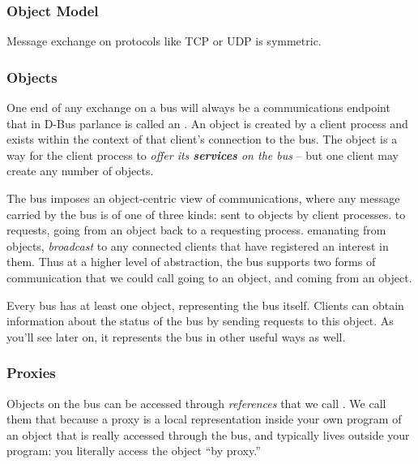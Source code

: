 \documentclass{myproc}
\begin{document}
\subsubsection{Object Model}
Message exchange on protocols like TCP or UDP is symmetric. 

\subsubsection{Objects}
One end of any exchange on a bus will always be a communications endpoint that
in D-Bus parlance is called an . An object is created by a client
process and exists within the context of that client's connection to the
bus. The object is a way for the client process to {\em offer its {\bfseries services\/} on the
bus\/} -- but one client may create any number of objects. 

The bus imposes an object-centric view of communications, where any message
carried by the bus is of one of three kinds: 
\ben
\w {} sent to objects by client processes.
\w {} to requests, going from an object back to a requesting process.
\w {} emanating from objects, {\em broadcast\/} to any
connected clients that have registered an interest in them.
\een
Thus at a higher level of abstraction, the bus supports two forms of
communication that we could call  going to an
object, and 
 coming from an object. 

Every bus has at least one object, representing the bus itself. Clients can
obtain information about the status of the bus by sending requests to this
object. As you'll see later on, it represents the bus in other useful ways as
well. 


\subsubsection{Proxies}
Objects on the bus can be accessed through {\em references\/} that we call
. We 
call them that because a proxy is a local representation inside your own
program of an object that is really accessed through the bus, and typically
lives outside your program: you literally access the object ``by proxy.''

\end{document}
